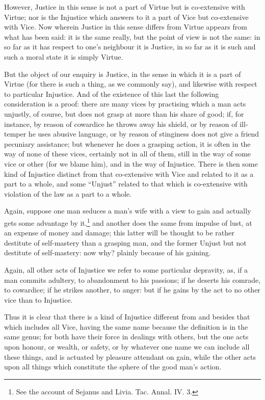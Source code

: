 However, Justice in this sense is not a part of Virtue but is co-extensive with
Virtue; nor is the Injustice which answers to it a part of Vice but
co-extensive with Vice. Now wherein Justice in this sense differs from Virtue
appears from what has been said: it is the same really, but the point of view
is not the same: in so far as it has respect to one’s neighbour it is
Justice, in so far as it is such and such a moral state it is simply Virtue.


But the object of our enquiry is Justice, in the sense in which it is a part of
Virtue (for there is such a thing, as we commonly say), and likewise with
respect to particular Injustice. And of the existence of this last the
following consideration is a proof: there are many vices by practising which a
man acts unjustly, of course, but does not grasp at more than his share of
good; if, for instance, by reason of cowardice he throws away his shield, or by
reason of ill-temper he uses abusive language, or by reason of stinginess does
not give a friend pecuniary assistance; but whenever he does a grasping action,
it is often in the way of none of these vices, certainly not in all of them,
still in the way of some vice or other (for we blame him), and in the way of
Injustice. There is then some kind of Injustice distinct from that co-extensive
with Vice and related to it as a part to a whole, and some “Unjust”
related to that which is co-extensive with violation of the law as a part to a
whole.

Again, suppose one man seduces a man’s wife with a view to gain and
actually gets some advantage by it,\footnote{See the account of Sejanus and Livia. Tac. Annal. IV. 3.}
and another does the same from impulse of lust, at an expense of money and
damage; this latter will be thought to be rather destitute of self-mastery than
a grasping man, and the former Unjust but not destitute of self-mastery: now
why? plainly because of his gaining.

Again, all other acts of Injustice we refer to some particular depravity, as,
if a man commits adultery, to abandonment to his passions; if he deserts his
comrade, to cowardice; if he strikes another, to anger: but if he gains by the
act to no other vice than to Injustice.

Thus it is clear that there is a kind of Injustice different from and besides
that which includes all Vice, having the same name because the definition is in
the same genus; for both have their force in dealings with others, but the one
acts upon honour, or wealth, or safety, or by whatever one name we can include
all these things, and is actuated by pleasure attendant on gain, while the
other acts upon all things which constitute the sphere of the good man’s
action.

